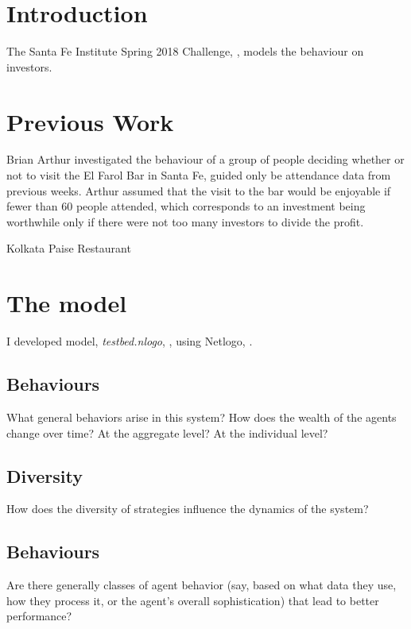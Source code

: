 \documentclass[]{article}
\title{}
\author{}
\begin{document}
\maketitle

\begin{abstract}

\end{abstract}

\section{Introduction}
The Santa Fe Institute Spring 2018 Challenge, \cite{Challenge:2018}, models the behaviour on investors.
\section{Previous Work}


Brian Arthur \cite{Arthur:1992} investigated the behaviour of a group of people deciding whether or not to visit the El Farol Bar \cite{ElFarol:2010} in Santa Fe, guided only be attendance data from previous weeks. Arthur assumed that the visit to the bar would be enjoyable if fewer than 60 people attended, which corresponds to an investment being worthwhile only if there were not too many investors to divide the profit.

Kolkata Paise Restaurant \cite{Chakrabarti:2007}
\cite{Chakrabarti:2009}
\section{The model}
I developed model, \emph{testbed.nlogo}, \cite{Github:2018}, using Netlogo, \cite{Wilensky:1999}.
\subsection{Behaviours}What general behaviors arise in this system?  How does the wealth of the agents change over time? At the aggregate level? At the individual level?
\subsection{Diversity}How does the diversity of strategies influence the dynamics of the system?
\subsection{Behaviours}Are there generally classes of agent behavior (say, based on what data they use, how they process it, or the agent's overall sophistication) that lead to better performance?
\end{document}
